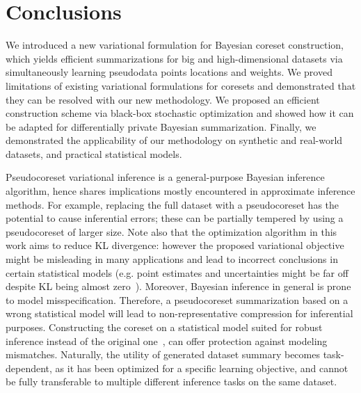 \section{Conclusions}
We introduced a new variational formulation for Bayesian coreset construction, which yields efficient summarizations for big and high-dimensional datasets via simultaneously learning pseudodata points locations and weights. We proved limitations of existing variational formulations for coresets and demonstrated that they can be resolved with our new methodology. We proposed an efficient construction scheme via black-box stochastic optimization and showed how it can be adapted for differentially private Bayesian summarization. Finally, we demonstrated the applicability of our methodology on synthetic and real-world datasets, and practical statistical models.  


Pseudocoreset variational inference is a general-purpose Bayesian inference
algorithm, hence shares implications mostly encountered in approximate
inference methods. For example, replacing the full dataset with a
pseudocoreset has the potential to cause inferential errors; these can be
partially tempered by using a pseudocoreset of larger size. Note also
that the optimization algorithm in this work aims to reduce 
KL divergence: however the proposed
variational objective might be misleading in many applications and lead to
incorrect conclusions in certain statistical models (e.g. point estimates and
uncertainties might be far off despite KL being almost zero~\citep{huggins20}).
Moreover, Bayesian inference in general is prone to model misspecification.
Therefore, a pseudocoreset summarization based on a wrong statistical model
will lead to non-representative compression for inferential purposes.
Constructing the coreset on a statistical model suited for robust inference
instead of the original one~\citep{miller19, wang17}, can offer protection
against modeling mismatches. Naturally, the utility of generated dataset
summary becomes task-dependent, as it has been optimized for a specific
learning objective, and cannot be fully transferable to multiple different
inference tasks on the same dataset.

